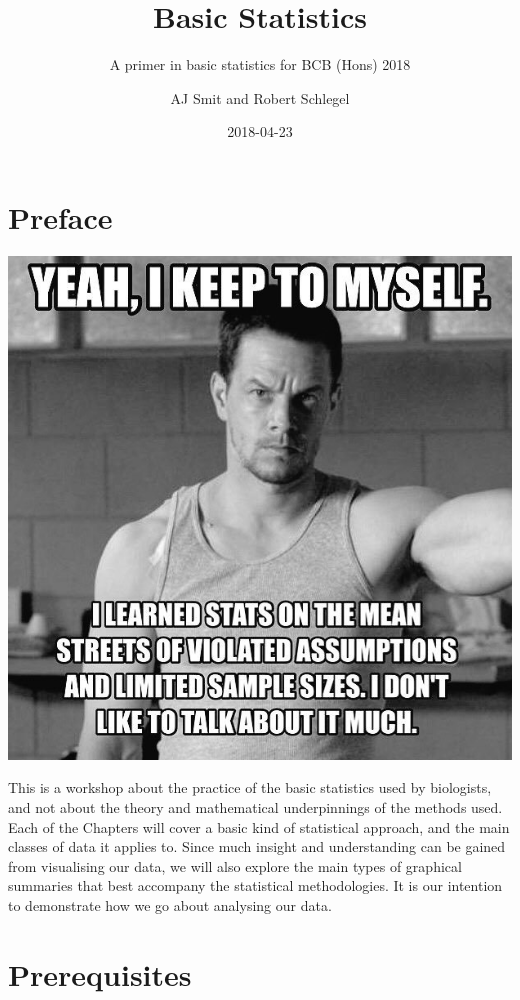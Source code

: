 \documentclass[english,10pt,a4paper,oneside]{book}
\title{Basic Statistics}
\subtitle{\sf A primer in basic statistics for BCB (Hons) 2018}
\author{AJ Smit and Robert Schlegel}
\date{2018-04-23}
\theoremstyle{definition}
\theoremstyle{definition}
\theoremstyle{definition}
\theoremstyle{remark}
\begin{document}
\maketitle



{
\hypersetup{linkcolor=black}
\setcounter{tocdepth}{2}
\tableofcontents
}



\hypertarget{preface}{%
\chapter*{Preface}\label{preface}}


\includegraphics[width=0.7\linewidth]{figures/walberg_assumptions}

This is a workshop about the practice of the basic statistics used by
biologists, and not about the theory and mathematical underpinnings of
the methods used. Each of the Chapters will cover a basic kind of
statistical approach, and the main classes of data it applies to. Since
much insight and understanding can be gained from visualising our data,
we will also explore the main types of graphical summaries that best
accompany the statistical methodologies. It is our intention to
demonstrate how we go about analysing our data.

\hypertarget{prerequisites}{%
\chapter*{Prerequisites}\label{prerequisites}}
\end{document}
